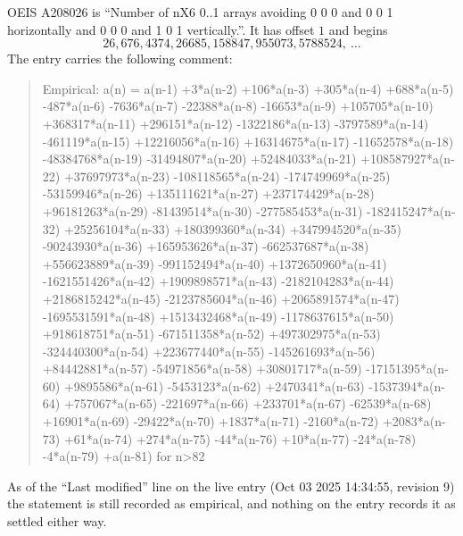 \documentclass[11pt,a4paper]{article}
\theoremstyle{plain}
\theoremstyle{definition}
\begin{document}
OEIS A208026 is ``Number of nX6 0..1 arrays avoiding 0 0 0 and 0 0 1 horizontally and 0 0 0 and 1 0 1 vertically.''. It has offset
$1$ and begins
\[
26, 676, 4374, 26685, 158847, 955073, 5788524,\ \dots
\]
The entry carries the following comment:
\begin{quote}\small
Empirical: a(n) = a(n-1) +3*a(n-2) +106*a(n-3) +305*a(n-4) +688*a(n-5) -487*a(n-6) -7636*a(n-7) -22388*a(n-8) -16653*a(n-9) +105705*a(n-10) +368317*a(n-11) +296151*a(n-12) -1322186*a(n-13) -3797589*a(n-14) -461119*a(n-15) +12216056*a(n-16) +16314675*a(n-17) -11652578*a(n-18) -48384768*a(n-19) -31494807*a(n-20) +52484033*a(n-21) +108587927*a(n-22) +37697973*a(n-23) -108118565*a(n-24) -174749969*a(n-25) -53159946*a(n-26) +135111621*a(n-27) +237174429*a(n-28) +96181263*a(n-29) -81439514*a(n-30) -277585453*a(n-31) -182415247*a(n-32) +25256104*a(n-33) +180399360*a(n-34) +347994520*a(n-35) -90243930*a(n-36) +165953626*a(n-37) -662537687*a(n-38) +556623889*a(n-39) -991152494*a(n-40) +1372650960*a(n-41) -1621551426*a(n-42) +1909898571*a(n-43) -2182104283*a(n-44) +2186815242*a(n-45) -2123785604*a(n-46) +2065891574*a(n-47) -1695531591*a(n-48) +1513432468*a(n-49) -1178637615*a(n-50) +918618751*a(n-51) -671511358*a(n-52) +497302975*a(n-53) -324440300*a(n-54) +223677440*a(n-55) -145261693*a(n-56) +84442881*a(n-57) -54971856*a(n-58) +30801717*a(n-59) -17151395*a(n-60) +9895586*a(n-61) -5453123*a(n-62) +2470341*a(n-63) -1537394*a(n-64) +757067*a(n-65) -221697*a(n-66) +233701*a(n-67) -62539*a(n-68) +16901*a(n-69) -29422*a(n-70) +1837*a(n-71) -2160*a(n-72) +2083*a(n-73) +61*a(n-74) +274*a(n-75) -44*a(n-76) +10*a(n-77) -24*a(n-78) -4*a(n-79) +a(n-81) for n>82
\end{quote}
As of the ``Last modified'' line on the live entry (Oct 03 2025 14:34:55, revision
9) the statement is still recorded as empirical, and nothing on the entry
records it as settled either way.
\end{document}
